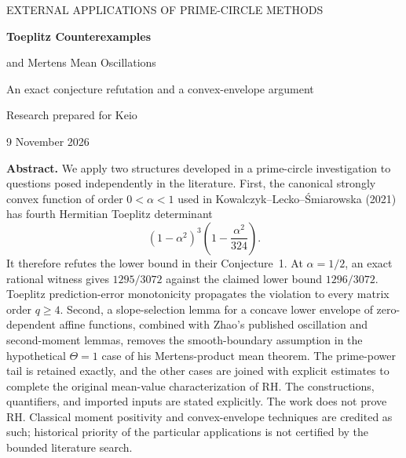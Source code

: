 \documentclass[11pt,a4paper]{article}
\numberwithin{equation}{section}
\theoremstyle{definition}\newtheorem{definition}[theorem]{Definition}
\theoremstyle{remark}\newtheorem{remark}[theorem]{Remark}
\begin{document}
\hypersetup{pageanchor=false}
\begin{titlepage}
\centering
\vspace*{18mm}
{\small\color{accent}\sffamily EXTERNAL APPLICATIONS OF PRIME-CIRCLE METHODS\par}
\vspace{12mm}
{\LARGE\bfseries\color{ink}Toeplitz Counterexamples\par\vspace{3mm}
and Mertens Mean Oscillations\par}
\vspace{7mm}
{\large An exact conjecture refutation and a convex-envelope argument\par}
\vspace{13mm}
{Research prepared for Keio\par}
\vspace{3mm}
{9 November 2026\par}
\vspace{12mm}
\begin{minipage}{0.94\textwidth}
\textbf{Abstract.}
We apply two structures developed in a prime-circle investigation to questions
posed independently in the literature. First, the canonical strongly convex
function of order $0<\alpha<1$ used in Kowalczyk--Lecko--\'{S}miarowska (2021)
has fourth Hermitian Toeplitz determinant
\[
 (1-\alpha^2)^3\left(1-\frac{\alpha^2}{324}\right).
\]
It therefore refutes the lower bound in their Conjecture~1. At
$\alpha=1/2$, an exact rational witness gives $1295/3072$ against the claimed
lower bound $1296/3072$. Toeplitz prediction-error monotonicity propagates
the violation to every matrix order $q\ge4$. Second, a slope-selection lemma
for a concave lower envelope of zero-dependent affine functions, combined
with Zhao's published oscillation and second-moment lemmas, removes the
smooth-boundary assumption in the hypothetical $\Theta=1$ case of his
Mertens-product mean theorem. The prime-power tail is retained exactly, and the other cases are
joined with explicit estimates to complete the original mean-value
characterization of RH.
The constructions, quantifiers, and imported inputs are stated explicitly.
The work does not prove RH. Classical moment positivity and convex-envelope
techniques are credited as such; historical priority of the particular
applications is not certified by the bounded literature search.
\end{minipage}
\vfill
\begin{minipage}{0.94\textwidth}
\centering\small
{}
\end{minipage}
\end{titlepage}
\hypersetup{pageanchor=true}
\tableofcontents
\clearpage
{}
\end{document}
